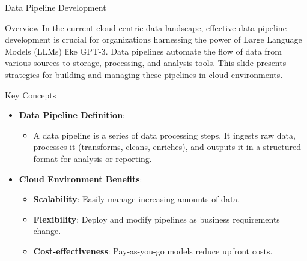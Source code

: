 \documentclass[aspectratio=169]{beamer}
\begin{document}
\begin{frame}{Data Pipeline Development}
    \begin{block}{Overview}
        In the current cloud-centric data landscape, effective data pipeline development is crucial for organizations harnessing the power of Large Language Models (LLMs) like GPT-3. Data pipelines automate the flow of data from various sources to storage, processing, and analysis tools. This slide presents strategies for building and managing these pipelines in cloud environments.
    \end{block}
\end{frame}

\begin{frame}{Key Concepts}
    \begin{itemize}
        \item \textbf{Data Pipeline Definition}:
        \begin{itemize}
            \item A data pipeline is a series of data processing steps. It ingests raw data, processes it (transforms, cleans, enriches), and outputs it in a structured format for analysis or reporting.
        \end{itemize}
        
        \item \textbf{Cloud Environment Benefits}:
        \begin{itemize}
            \item \textbf{Scalability}: Easily manage increasing amounts of data.
            \item \textbf{Flexibility}: Deploy and modify pipelines as business requirements change.
            \item \textbf{Cost-effectiveness}: Pay-as-you-go models reduce upfront costs.
        \end{itemize}
    \end{itemize}
\end{frame}
\end{document}
